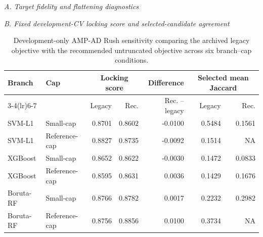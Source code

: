 \begin{table}[p]
\centering
\caption{Development-only AMP-AD Rush sensitivity comparing the archived legacy objective with the recommended untruncated objective across six branch--cap conditions.}
\label{tab:supp16}
\footnotesize
\setlength{\tabcolsep}{3.2pt}
\renewcommand{\arraystretch}{1.08}
\textit{A. Target fidelity and flattening diagnostics}\par\smallskip
{}

\vspace{0.9em}
\textit{B. Fixed development-CV locking score and selected-candidate agreement}\par\smallskip
\begin{tabular}{llrrrrr}
\toprule
Branch & Cap & \multicolumn{2}{c}{Locking score} & Difference & \multicolumn{2}{c}{Selected mean Jaccard} \\
\cmidrule(lr){3-4}\cmidrule(lr){6-7}
 & & Legacy & Rec. & Rec. -- legacy & Legacy & Rec. \\
\midrule
SVM-L1 & Small-cap & 0.8701 & 0.8602 & -0.0100 & 0.5484 & 0.1561 \\
SVM-L1 & Reference-cap & 0.8827 & 0.8735 & -0.0092 & 0.1514 & NA \\
XGBoost & Small-cap & 0.8652 & 0.8622 & -0.0030 & 0.1472 & 0.0833 \\
XGBoost & Reference-cap & 0.8595 & 0.8631 & 0.0036 & 0.1429 & 0.1676 \\
Boruta-RF & Small-cap & 0.8766 & 0.8782 & 0.0017 & 0.2232 & 0.2982 \\
Boruta-RF & Reference-cap & 0.8756 & 0.8856 & 0.0100 & 0.3734 & NA \\
\bottomrule
\end{tabular}


\end{table}
